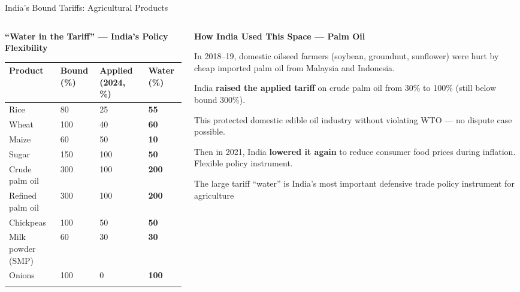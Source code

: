 \documentclass[
  ignorenonframetext,
  aspectratio=169,
]{beamer}
\makeatletter
\let\quarto@originallabel\label
\DeclareRobustCommand*{\label}[1]{\quarto@originallabel{#1}}
\makeatother
\begin{document}
\begin{frame}{India's Bound Tariffs: Agricultural Products}
\label{indias-bound-tariffs-agricultural-products}
\begin{columns}[T]
\begin{column}{0.5\linewidth}
\textbf{``Water in the Tariff'' --- India's Policy Flexibility}

\begin{longtable}[]{@{}llll@{}}
\toprule\noalign{}
Product & Bound (\%) & Applied (2024, \%) & Water (\%) \\
\midrule\noalign{}
\endhead
Rice & 80 & 25 & \textbf{55} \\
Wheat & 100 & 40 & \textbf{60} \\
Maize & 60 & 50 & \textbf{10} \\
Sugar & 150 & 100 & \textbf{50} \\
Crude palm oil & 300 & 100 & \textbf{200} \\
Refined palm oil & 300 & 100 & \textbf{200} \\
Chickpeas & 100 & 50 & \textbf{50} \\
Milk powder (SMP) & 60 & 30 & \textbf{30} \\
Onions & 100 & 0 & \textbf{100} \\
\bottomrule\noalign{}
\end{longtable}
\end{column}

\begin{column}{0.5\linewidth}
\textbf{How India Used This Space --- Palm Oil}

In 2018--19, domestic oilseed farmers (soybean, groundnut, sunflower)
were hurt by cheap imported palm oil from Malaysia and Indonesia.

India \textbf{raised the applied tariff} on crude palm oil from 30\% to
100\% (still below bound 300\%).

This protected domestic edible oil industry without violating WTO --- no
dispute case possible.

Then in 2021, India \textbf{lowered it again} to reduce consumer food
prices during inflation. Flexible policy instrument.

The large tariff ``water'' is India's most important defensive trade
policy instrument for agriculture
\end{column}
\end{columns}
\end{frame}
\end{document}
